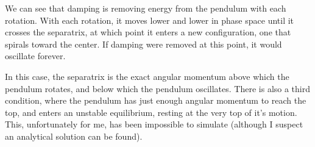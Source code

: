 \documentclass{article}
\begin{document}
We can see that damping is removing energy from the pendulum with each rotation. With each rotation, it moves lower and lower in phase space until it crosses the separatrix, at which point it enters a new configuration, one that spirals toward the center. If damping were removed at this point, it would oscillate forever.

In this case, the separatrix is the exact angular momentum above which the pendulum rotates, and below which the pendulum oscillates. There is also a third condition, where the pendulum has just enough angular momentum to reach the top, and enters an unstable equilibrium, resting at the very top of it's motion. This, unfortunately for me, has been impossible to simulate (although I suspect an analytical solution can be found).
\end{document}
